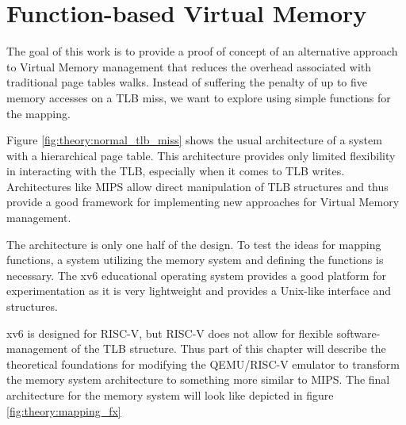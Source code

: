 


\section{Function-based Virtual Memory}


The goal of this work is to provide a proof of concept of an alternative approach
to Virtual Memory management that reduces the overhead associated with traditional page tables walks.
Instead of suffering the penalty of up to five memory accesses on a TLB miss,
we want to explore using simple functions for the mapping.

Figure \ref{fig:theory:normal_tlb_miss} shows the usual architecture of a system
with a hierarchical page table.
This architecture provides only limited flexibility in interacting with the TLB, especially when it comes to TLB writes.
Architectures like MIPS allow direct manipulation of TLB structures and thus provide a good framework for implementing new approaches for Virtual Memory management.

The architecture is only one half of the design. To test the ideas for mapping
functions, a system utilizing the memory system and defining the functions is necessary.
The xv6 educational operating system provides a good platform for experimentation as it is very lightweight and provides a Unix-like interface and structures.

xv6 is designed for RISC-V, but RISC-V does not allow for flexible software-management of the TLB structure.
Thus part of this chapter will describe the theoretical foundations for modifying
the QEMU/RISC-V emulator to transform the memory system architecture to something
more similar to MIPS.
The final architecture for the memory system will look like depicted in figure \ref{fig:theory:mapping_fx}

